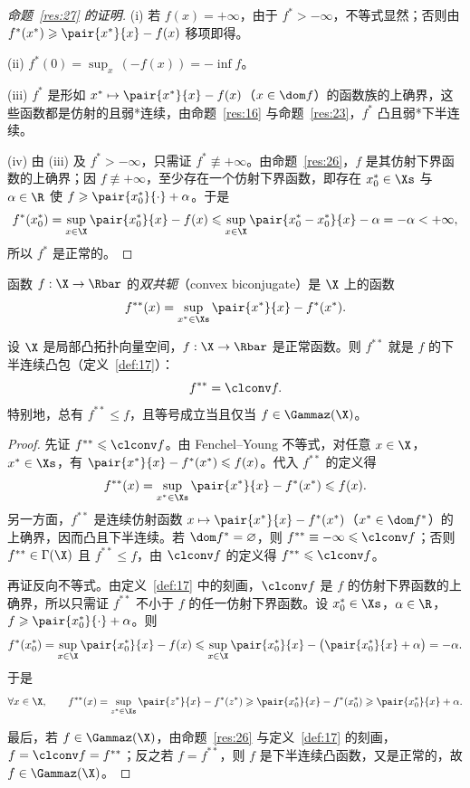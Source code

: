 \begin{proof}[命题~\ref{res:27} 的证明]
(i) 若 $f(x)=+\infty$，由于 $f^*>-\infty$，不等式显然；否则由 $f^*(x^*)\geqslant\pair{x^*}{x}-f(x)$ 移项即得。

(ii) $f^*(0)=\sup_x\,(-f(x))=-\inf f$。

(iii) $f^*$ 是形如 $x^*\mapsto\pair{x^*}{x}-f(x)$（$x\in\dom f$）的函数族的上确界，这些函数都是仿射的且弱*连续，由命题~\ref{res:16} 与命题~\ref{res:23}，$f^*$ 凸且弱*下半连续。

(iv) 由 (iii) 及 $f^*>-\infty$，只需证 $f^*\not\equiv+\infty$。由命题~\ref{res:26}，$f$ 是其仿射下界函数的上确界；因 $f\not\equiv+\infty$，至少存在一个仿射下界函数，即存在 $x_0^*\in\Xs$ 与 $\alpha\in\R$ 使 $f\geqslant\pair{x_0^*}{\cdot}+\alpha$。于是
\[
  f^*(x_0^*)=\sup_{x\in\X}\pair{x_0^*}{x}-f(x)\leqslant\sup_{x\in\X}\pair{x_0^*-x_0^*}{x}-\alpha=-\alpha<+\infty,
\]
所以 $f^*$ 是正常的。
\end{proof}

\begin{definition}[双共轭]
\label{def:19}
函数 $f:\X\to\Rbar$ 的\emph{双共轭}（convex biconjugate）是 $\X$ 上的函数
\[
  f^{**}(x)=\sup_{x^*\in\Xs}\pair{x^*}{x}-f^*(x^*).
\]
\end{definition}

\begin{theorem}
\label{res:28}
设 $\X$ 是局部凸拓扑向量空间，$f:\X\to\Rbar$ 是正常函数。则 $f^{**}$ 就是 $f$ 的下半连续凸包（定义~\ref{def:17}）：
\[
  f^{**}=\clconv f .
\]
特别地，总有 $f^{**}\leqslant f$，且等号成立当且仅当 $f\in\Gammaz(\X)$。
\end{theorem}

\begin{proof}
先证 $f^{**}\leqslant\clconv f$。由 Fenchel--Young 不等式，对任意 $x\in\X$，$x^*\in\Xs$，有 $\pair{x^*}{x}-f^*(x^*)\leqslant f(x)$。代入 $f^{**}$ 的定义得
\[
  f^{**}(x)=\sup_{x^*\in\Xs}\pair{x^*}{x}-f^*(x^*)\leqslant f(x).
\]
另一方面，$f^{**}$ 是连续仿射函数 $x\mapsto\pair{x^*}{x}-f^*(x^*)$（$x^*\in\dom f^*$）的上确界，因而凸且下半连续。若 $\dom f^*=\varnothing$，则 $f^{**}\equiv-\infty\leqslant\clconv f$；否则 $f^{**}\in\Gamma(\X)$ 且 $f^{**}\leqslant f$，由 $\clconv f$ 的定义得 $f^{**}\leqslant\clconv f$。

再证反向不等式。由定义~\ref{def:17} 中的刻画，$\clconv f$ 是 $f$ 的仿射下界函数的上确界，所以只需证 $f^{**}$ 不小于 $f$ 的任一仿射下界函数。设 $x_0^*\in\Xs$，$\alpha\in\R$，$f\geqslant\pair{x_0^*}{\cdot}+\alpha$。则
\[
  f^*(x_0^*)=\sup_{x\in\X}\pair{x_0^*}{x}-f(x)\leqslant\sup_{x\in\X}\pair{x_0^*}{x}-\bigl(\pair{x_0^*}{x}+\alpha\bigr)=-\alpha .
\]
于是
\[
  \forall x\in\X,\qquad f^{**}(x)=\sup_{z^*\in\Xs}\pair{z^*}{x}-f^*(z^*)\geqslant\pair{x_0^*}{x}-f^*(x_0^*)\geqslant\pair{x_0^*}{x}+\alpha .
\]

最后，若 $f\in\Gammaz(\X)$，由命题~\ref{res:26} 与定义~\ref{def:17} 的刻画，$f=\clconv f=f^{**}$；反之若 $f=f^{**}$，则 $f$ 是下半连续凸函数，又是正常的，故 $f\in\Gammaz(\X)$。
\end{proof}

